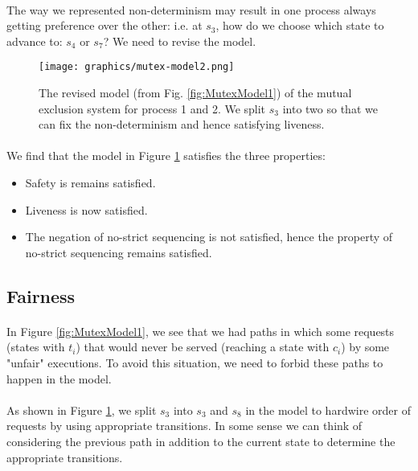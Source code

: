 \documentclass{article}
\theoremstyle{plain}
\theoremstyle{definition}
\begin{document}
\begin{multicols}{2}
\paragraph{} The way we represented non-determinism may result in one process always getting preference over the other: i.e. at $s_3$, how do we choose which state to advance to: $s_4$ or $s_7$? We need to revise the model.

\begin{figure}[H]
\centering
\texttt{[image: graphics/mutex-model2.png]}
\caption{The revised model (from Fig. \ref{fig:MutexModel1}) of the mutual exclusion system for process 1 and 2. We split $s_3$ into two so that we can fix the non-determinism and hence satisfying liveness.}\label{fig:MutexModel2}
\end{figure}

\paragraph{} We find that the model in Figure \ref{fig:MutexModel2} satisfies the three properties:

\begin{itemize}
\item Safety is remains satisfied.
\item Liveness is now satisfied.
\item The negation of no-strict sequencing is not satisfied, hence the property of no-strict sequencing remains satisfied.
\end{itemize}

\subsection{Fairness}

\paragraph{} In Figure \ref{fig:MutexModel1}, we see that we had paths in which some requests (states with $t_i$) that would never be served (reaching a state with $c_i$) by some "unfair" executions. To avoid this situation, we need to forbid these paths to happen in the model.

\paragraph{} As shown in Figure \ref{fig:MutexModel2}, we split $s_3$ into $s_3$ and $s_8$ in the model to hardwire order of requests by using appropriate transitions. In some sense we can think of considering the previous path in addition to the current state to determine the appropriate transitions. 


\end{multicols}
\end{document}
